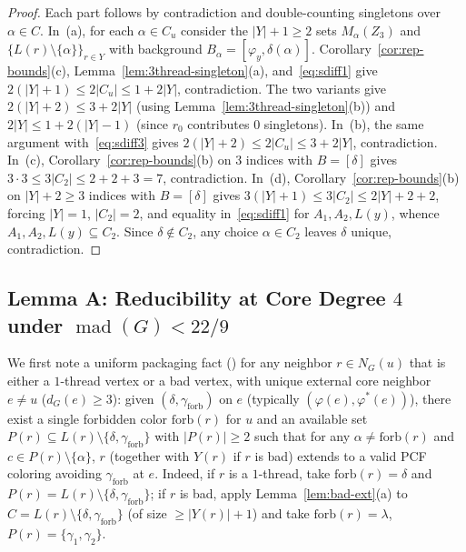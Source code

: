\documentclass[11pt,a4paper]{article}
\theoremstyle{definition}
\newcommand{\mad}{\operatorname{mad}}
\newcommand{\code}[1]{\texttt{\detokenize{#1}}}
\begin{document}
\begin{proof}
Each part follows by contradiction and double-counting singletons over $\alpha \in C$.
In~(a), for each $\alpha \in C_u$ consider the $|Y|+1 \ge 2$ sets $M_\alpha(Z_3)$ and $\{L(r)\setminus\{\alpha\}\}_{r \in Y}$ with background $B_\alpha = [\varphi_y, \delta(\alpha)]$. Corollary~\ref{cor:rep-bounds}(c), Lemma~\ref{lem:3thread-singleton}(a), and~\eqref{eq:sdiff1} give $2(|Y|+1) \le 2|C_u| \le 1 + 2|Y|$, contradiction. The two variants give $2(|Y|+2) \le 3 + 2|Y|$ (using Lemma~\ref{lem:3thread-singleton}(b)) and $2|Y| \le 1 + 2(|Y|-1)$ (since $r_0$ contributes $0$ singletons).
In~(b), the same argument with~\eqref{eq:sdiff3} gives $2(|Y|+2) \le 2|C_u| \le 3 + 2|Y|$, contradiction.
In~(c), Corollary~\ref{cor:rep-bounds}(b) on $3$ indices with $B = [\delta]$ gives $3 \cdot 3 \le 3|C_2| \le 2 + 2 + 3 = 7$, contradiction.
In~(d), Corollary~\ref{cor:rep-bounds}(b) on $|Y|+2 \ge 3$ indices with $B = [\delta]$ gives $3(|Y|+1) \le 3|C_2| \le 2|Y| + 2 + 2$, forcing $|Y| = 1$, $|C_2| = 2$, and equality in~\eqref{eq:sdiff1} for $A_1, A_2, L(y)$, whence $A_1, A_2, L(y) \subseteq C_2$. Since $\delta \notin C_2$, any choice $\alpha \in C_2$ leaves $\delta$ unique, contradiction.
\end{proof}

\subsection{Lemma A: Reducibility at Core Degree \texorpdfstring{$4$}{4} under \texorpdfstring{$\mad(G) < 22/9$}{mad(G) < 22/9}}

We first note a uniform packaging fact (\code{ab_color_pack}) for any neighbor $r \in N_G(u)$ that is either a $1$-thread vertex or a bad vertex, with unique external core neighbor $e \neq u$ ($d_G(e) \ge 3$): given $(\delta, \gamma_{\mathrm{forb}})$ on $e$ (typically $(\varphi(e), \varphi^*(e))$), there exist a single forbidden color $\mathrm{forb}(r)$ for $u$ and an available set $P(r) \subseteq L(r) \setminus \{\delta, \gamma_{\mathrm{forb}}\}$ with $|P(r)| \ge 2$ such that for any $\alpha \neq \mathrm{forb}(r)$ and $c \in P(r) \setminus \{\alpha\}$, $r$ (together with $Y(r)$ if $r$ is bad) extends to a valid PCF coloring avoiding $\gamma_{\mathrm{forb}}$ at $e$. Indeed, if $r$ is a $1$-thread, take $\mathrm{forb}(r) = \delta$ and $P(r) = L(r) \setminus \{\delta, \gamma_{\mathrm{forb}}\}$; if $r$ is bad, apply Lemma~\ref{lem:bad-ext}(a) to $C = L(r) \setminus \{\delta, \gamma_{\mathrm{forb}}\}$ (of size $\ge |Y(r)| + 1$) and take $\mathrm{forb}(r) = \lambda$, $P(r) = \{\gamma_1, \gamma_2\}$.
\end{document}
